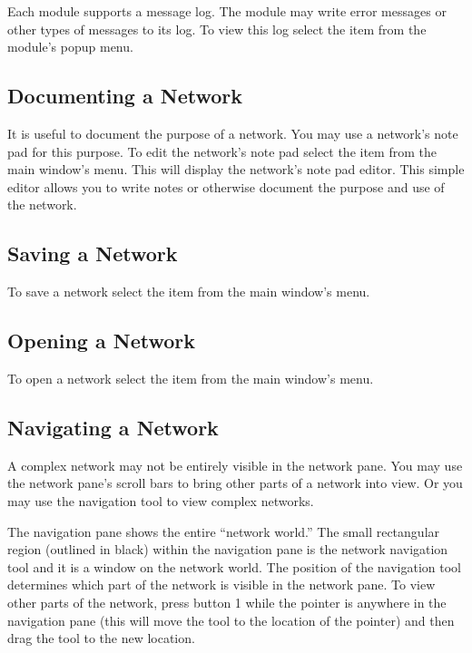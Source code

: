 Each module supports a message log.  The module may write error messages or
other types of messages to its log.  To view this log select the
 item from the module's popup menu.

\subsection{Documenting a Network}
\label{sec:docnetwork}

It is useful to document the purpose of a network.  You may use a network's
note pad for this purpose.  To edit the network's note pad select the
 item from the main window's  menu.  This
will display the network's note pad editor.  This simple editor allows you
to write notes or otherwise document the purpose and use of the network.


\subsection{Saving a Network}
\label{sec:savenet}

To save a network select the  item from the main window's
 menu.


\subsection{Opening a Network}
\label{sec:opennet}

To open a network select the  item from the main window's
 menu.


\subsection{Navigating a Network}
\label{sec:navnetwork}

A complex network may not be entirely visible in the network pane.  You may
use the network pane's scroll bars to bring other parts of a network into
view.  Or you may use the navigation tool to view complex networks.

The navigation pane shows the entire ``network world.''  The small
rectangular region (outlined in black) within the navigation pane is the
network navigation tool and it is a window on the network world.  The
position of the navigation tool determines which part of the network is
visible in the network pane.  To view other parts of the network, press
button 1 while the pointer is anywhere in the navigation pane (this will
move the tool to the location of the pointer) and then drag the tool to the
new location.



